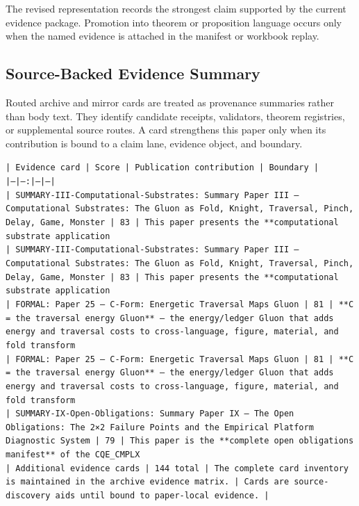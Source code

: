\documentclass[11pt]{article}
\begin{document}
The revised representation records the strongest claim supported by the current evidence package. Promotion into theorem or proposition language occurs only when the named evidence is attached in the manifest or workbook replay.

\subsection*{Source-Backed Evidence Summary}

Routed archive and mirror cards are treated as provenance summaries rather than
body text. They identify candidate receipts, validators, theorem registries, or
supplemental source routes. A card strengthens this paper only when its
contribution is bound to a claim lane, evidence object, and boundary.

\noindent\texttt{| Evidence card | Score | Publication contribution | Boundary |}\\
\noindent\texttt{|---|---:|---|---|}\\
\noindent\texttt{| SUMMARY-III-Computational-Substrates: Summary Paper III — Computational Substrates: The Gluon as Fold, Knight, Traversal, Pinch, Delay, Game, Monster | 83 | This paper presents the **computational substrate application}\\
\noindent\texttt{| SUMMARY-III-Computational-Substrates: Summary Paper III — Computational Substrates: The Gluon as Fold, Knight, Traversal, Pinch, Delay, Game, Monster | 83 | This paper presents the **computational substrate application}\\
\noindent\texttt{| FORMAL: Paper 25 — C-Form: Energetic Traversal Maps Gluon | 81 | **C = the traversal energy Gluon** — the energy/ledger Gluon that adds energy and traversal costs to cross-language, figure, material, and fold transform}\\
\noindent\texttt{| FORMAL: Paper 25 — C-Form: Energetic Traversal Maps Gluon | 81 | **C = the traversal energy Gluon** — the energy/ledger Gluon that adds energy and traversal costs to cross-language, figure, material, and fold transform}\\
\noindent\texttt{| SUMMARY-IX-Open-Obligations: Summary Paper IX — The Open Obligations: The 2×2 Failure Points and the Empirical Platform Diagnostic System | 79 | This paper is the **complete open obligations manifest** of the CQE\_CMPLX}\\
\noindent\texttt{| Additional evidence cards | 144 total | The complete card inventory is maintained in the archive evidence matrix. | Cards are source-discovery aids until bound to paper-local evidence. |}\\
\end{document}
